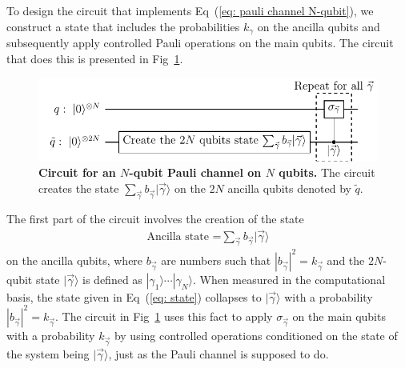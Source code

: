 \documentclass[10pt,letterpaper]{article} %
\newcommand{\fref}[1]{Fig~\ref{#1}}
\newcommand{\eref}[1]{Eq~(\ref{#1})}
\begin{document}
To design the circuit that implements \eref{eq: pauli channel N-qubit}, we construct a state that 
includes the probabilities $k_{\gamma}$ on the ancilla qubits and subsequently
apply controlled Pauli operations on the main qubits.  The circuit that does
this is presented in \fref{fig: circuit-pauli}. 


\begin{figure} %
\centering
\includegraphics{images/circuito_general.pdf}
\caption{{\bf Circuit for an $N$-qubit
Pauli channel on $N$ qubits.}
The circuit creates the state $\sum_{\vec{\gamma}} b_{\vec{\gamma}}|\vec{\gamma}\rangle$ 
on the $2N$ ancilla qubits denoted by $\tilde{q}$. }
\label{fig: circuit-pauli}
\end{figure} %

The first part of the circuit involves the creation of the state
\begin{eqnarray}
\label{eq: state}
\text{Ancilla state =} 
\sum_{\vec{\gamma}} b_{\vec{\gamma}} |\vec{\gamma} \rangle
\end{eqnarray}
on the ancilla qubits, where $b_{\vec{\gamma}}$ are numbers such that $
{|b_{\vec{\gamma}}|}^2 = k_{\vec{\gamma}}$ and
the $2N$-qubit state $|\vec{\gamma}\rangle$ is defined as $|\gamma_1\rangle
\cdots |\gamma_N\rangle$.
When measured in the computational basis, the state given in \eref{eq: state}
collapses to $|\vec{\gamma}\rangle$ with a 
probability ${|b_{\vec{\gamma}}|}^2 = k_{\vec\gamma}$. 
The circuit in \fref{fig: circuit-pauli} uses this fact
to apply $\sigma_{\vec{\gamma}}$ on the main qubits
with a probability $k_{\vec\gamma}$ by using controlled operations 
conditioned on the state of the system being $|\vec{\gamma}\rangle$,
just as the Pauli channel is supposed to do.  
% 
% 

 
\end{document}
